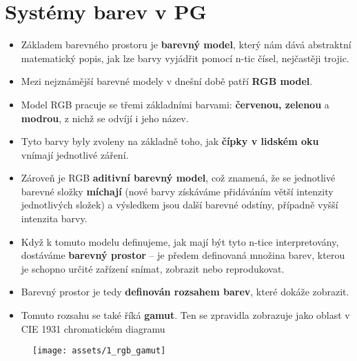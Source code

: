 \section{Systémy barev v PG}
\begin{itemize}
    \item Základem barevného prostoru je \textbf{barevný model}, který nám dává abstraktní matematický popis, jak lze barvy vyjádřit pomocí n-tic čísel, nejčastěji trojic.
    \item Mezi nejznámější barevné modely v dnešní době patří \textbf{RGB model}.
    \item Model RGB pracuje se třemi základními barvami: \textbf{červenou, zelenou} a \textbf{modrou}, z nichž se odvíjí i jeho název.
    \item Tyto barvy byly zvoleny na základně toho, jak \textbf{čípky v lidském oku} vnímají jednotlivé záření.
    \item Zároveň je RGB \textbf{aditivní barevný model}, což znamená, že se jednotlivé barevné složky \textbf{míchají} (nové barvy získáváme přidáváním větší intenzity jednotlivých složek) a výsledkem jsou další barevné odstíny, případně vyšší intenzita barvy.
    \item Když k tomuto modelu definujeme, jak mají být tyto n-tice interpretovány, dostáváme \textbf{barevný prostor} -- je předem definovaná množina barev, kterou je schopno určité zařízení snímat, zobrazit nebo reprodukovat.
    \item Barevný prostor je tedy \textbf{definován rozsahem barev}, které dokáže zobrazit.
    \item Tomuto rozsahu se také říká \textbf{gamut}. Ten se zpravidla zobrazuje jako oblast v CIE 1931 chromatickém diagramu
\end{itemize}
\begin{figure}[H]
    \centering
    \texttt{[image: assets/1\_rgb\_gamut]}
\end{figure}
